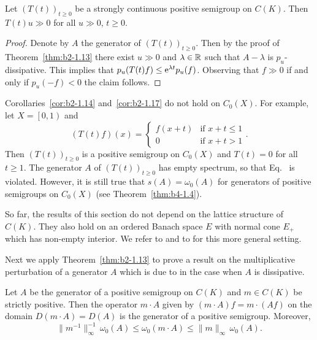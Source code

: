 \begin{corollary}\label{cor:b2-1.17}
Let $(T(t))_{t \geq 0}$ be a strongly continuous positive semigroup on $C(K)$.
Then $T(t)u \gg 0$ for all $u \gg 0$, $t \geq 0$.
\end{corollary}
\begin{proof}
Denote by $A$ the generator of\/ $(T(t))_{t \geq 0}$.
Then by the proof of Theorem~\ref{thm:b2-1.13} there exist $u \gg 0$ and $\lambda \in \mathbb{R}$ such that $A - \lambda$ is $p_{u}$-dissipative.
This implies that $p_{u}(T(t)f) \leq \eu^{\lambda t}p_{u}(f)$.
Observing that $f \gg 0$ if and only if\/ $p_{u}(-f) < 0$ the claim follows.
\end{proof}
\begin{remark}\label{rem:b2-1.18}
Corollaries~\ref{cor:b2-1.14} and~\ref{cor:b2-1.17} do not hold on $C_{0}(X)$.
For example, let $X = \left[0,1\right)$ and
\[
    (T(t)f)(x) = \begin{cases}
        f(x+t) & \text{if } x+t \leq 1 \\
        0 & \text{if } x+t > 1
    \end{cases}.
\]
Then $(T(t))_{t \geq 0}$ is a positive semigroup on $C_{0}(X)$ and $T(t) = 0$ for all $t \geq 1$.
The generator $A$ of\/ $(T(t))_{t \geq 0}$ has empty spectrum, so that Eq.~ is violated.
However, it is still true that $s(A) = \omega_{0}(A)$ for generators of positive semigroups on $C_{0}(X)$ (see Theorem~\ref{thm:b4-1.4}).
\end{remark}
\begin{remark}\label{rem:b2-1.19}
So far, the results of this section do not depend on the lattice structure of\/ $C(K)$.
They also hold on an ordered Banach space $E$ with normal cone $E_{+}$ which has non-empty interior.
We refer to \textcite{arendtchernoffkato:1982} and to \textcite{battyrobinson:1984} for this more general setting.
\end{remark}
Next we apply Theorem~\ref{thm:b2-1.13} to prove a result on the multiplicative perturbation of a generator $A$ which is due to \textcite{dorroh:1966} in the case when $A$ is dissipative.
\begin{theorem}\label{thm:b2-1.20}
Let $A$ be the generator of a positive semigroup on $C(K)$ and  $m \in C(K)$ be strictly positive.
Then the operator $m \cdot A$ given by $(m \cdot A)f = m \cdot (Af)$ on the domain $D(m \cdot A) = D(A)$ is the generator of a positive semigroup.
Moreover,
\begin{equation}\label{eq:b2-1.10}
\|m^{-1}\|_{\infty}^{-1}\, \omega_{0}(A) \leq \omega_{0}(m \cdot A) \leq \|m\|_{\infty}\, \omega_{0}(A).
\end{equation}
\end{theorem}
